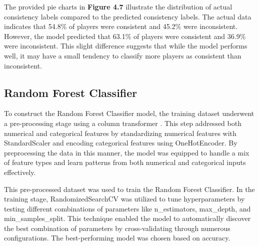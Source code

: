 \documentclass[12pt, a4paper,oneside]{book}
\numberwithin{equation}{section}
\begin{document}
The provided pie charts in \textbf{Figure 4.7} illustrate the distribution of actual consistency labels compared to the predicted consistency labels. The actual data indicates that 54.8\% of players were consistent and 45.2\% were inconsistent. However, the model predicted that 63.1\% of players were consistent and 36.9\% were inconsistent. This slight difference suggests that while the model performs well, it may have a small tendency to classify more players as consistent than inconsistent.

\subsection{Random Forest Classifier}\label{sec:4.4.2}

To construct the Random Forest Classifier model, the training dataset underwent a pre-processing stage using a column transformer \cite{breiman2001} \cite{Kaggle2021}. This step addressed both numerical and categorical features by standardizing numerical features with StandardScaler and encoding categorical features using OneHotEncoder. By preprocessing the data in this manner, the model was equipped to handle a mix of feature types and learn patterns from both numerical and categorical inputs effectively.

This pre-processed dataset was used to train the Random Forest Classifier. In the training stage, RandomizedSearchCV was utilized to tune hyperparameters by testing different combinations of parameters \cite{Biau2016}like n\_estimators, max\_depth, and min\_samples\_split. This technique enabled the model to automatically discover the best combination of parameters by cross-validating through numerous configurations. The best-performing model was chosen based on accuracy.
\end{document}
